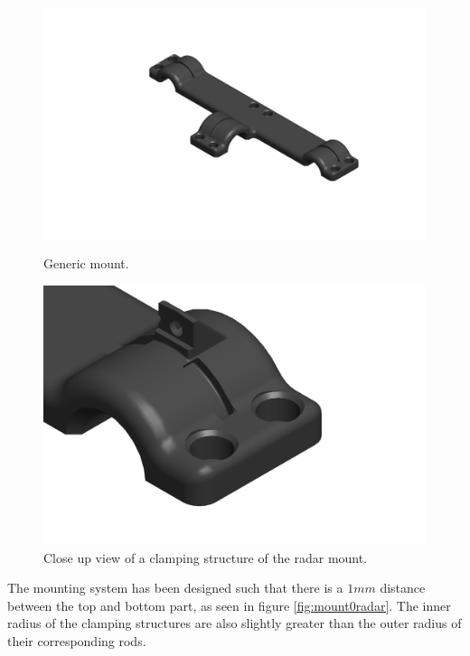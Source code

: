 \begin{figure}[H]
    \centering
    \begin{minipage}[b]{0.49\textwidth}
        \includegraphics[width=\textwidth]{Figures/CAD/GenericMountV2.PNG}
        \caption{Generic mount.}
        \label{fig:GenericMountV2}
    \end{minipage}
    \begin{minipage}[b]{0.49\textwidth}
        \includegraphics[width=\textwidth]{Figures/CAD/upperRadarMountV2CloseUp1.PNG}
        \caption{Close up view of a clamping structure of the radar mount.}
        \label{fig:upperRadarMountV2CloseUp1}
    \end{minipage}
\end{figure}

The mounting system has been designed such that there is a $1 mm$ distance between the top and bottom part, as seen in figure \ref{fig:mount0radar}. The inner radius of the clamping structures are also slightly greater than the outer radius of their corresponding rods.

